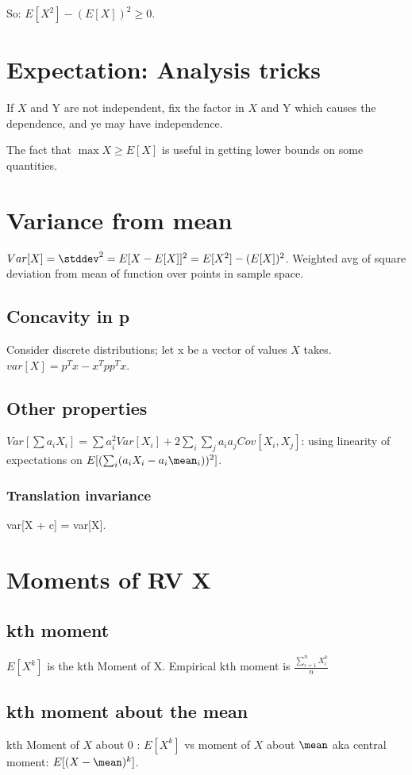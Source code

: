 \documentclass[oneside, article]{memoir}
\begin{document}
So: $E[X^{2}]-(E[X])^{2} \geq 0$.

\section{Expectation: Analysis tricks}
If $X$ and Y are not independent, fix the factor in $X$ and Y which causes the dependence, and ye may have independence.

The fact that $\max X \geq E[X]$ is useful in getting lower bounds on some quantities.


\section{Variance from mean}
$Var[X] = \stddev^{2} = E[X-E[X]]^{2} = E[X^{2}]-(E[X])^{2}$. Weighted avg of square deviation from mean of function over points in sample space.

\subsection{Concavity in p}
Consider discrete distributions; let x be a vector of values $X$ takes. $var[X] = p^{T}x - x^{T}pp^{T}x$.

\subsection{Other properties}
$Var[\sum a_{i}X_{i}] = \sum a_{i}^{2}Var[X_{i}]+2\sum_{i}\sum_{j}a_{i}a_{j} Cov[X_{i},X_{j}]$: using linearity of expectations on $E[(\sum_{i} (a_{i}X_{i} - a_{i}\mean_{i}))^{2}]$.

\subsubsection{Translation invariance}
var[X + c] = var[X].

\section{Moments of RV X}
\subsection{kth moment}
$E[X^{k}]$ is the kth Moment of X. Empirical kth moment is $\frac{\sum_{i=1}^{n} X_i^{k}}{n}$

\subsection{kth moment about the mean}
kth Moment of $X$ about 0 : $E[X^{k}]$ vs moment of $X$ about $\mean$ aka central moment: $E[(X - \mean)^{k}]$.
\end{document}
